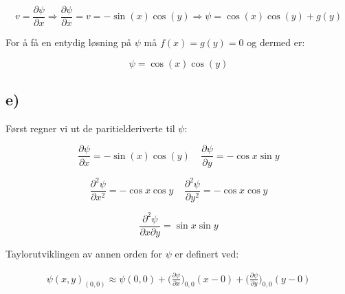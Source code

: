 \documentclass{article}
\begin{document}
\begin{flushle}
\begin{equation*}
v = \frac{\partial \psi}{\partial x} \Rightarrow \frac{\partial \psi}{\partial x} = v = -\sin{(x)}\cos{(y)} \Rightarrow \psi = \cos{(x)}\cos{(y)} + g(y)
\end{equation*}

\bigskip

\begin{flushleft}
For å få en entydig løsning på \(\psi\) må \(f(x) = g(y) = 0\) og dermed er:
\end{flushleft}

\begin{equation*}
\psi = \cos{(x)}\cos{(y)}
\end{equation*}


%
%

\subsection*{e)}

\begin{flushleft}
Først regner vi ut de paritielderiverte til \(\psi\):
\end{flushleft}

\begin{equation*}
\frac{\partial \psi}{\partial x} = -\sin{(x)}\cos{(y)} \ \ \ \ \ \frac{\partial \psi}{\partial y} = -\cos{x}\sin{y}
\end{equation*}

\bigskip

\begin{equation*}
\frac{\partial^2 \psi}{\partial x^2} = -\cos{x}\cos{y} \ \ \ \ \ \frac{\partial^2 \psi}{\partial y^2} = -\cos{x}\cos{y}
\end{equation*}

\bigskip

\begin{equation*}
\frac{\partial^2 \psi}{\partial x\partial y} = \sin{x}\sin{y}
\end{equation*}

\bigskip

\begin{flushleft}
Taylorutviklingen av annen orden for \(\psi\) er definert ved:
\end{flushleft}

\begin{align*}
\psi(x, y)_{(0,0)} \approx \psi(0,0) + \bigg( \frac{\partial \psi}{ \partial x} \bigg)_{0,0}(x - 0) + \bigg( \frac{\partial \psi}{ \partial y} \bigg)_{0,0}(y - 0)
\end{align*}


\end{flushle}
\end{document}
